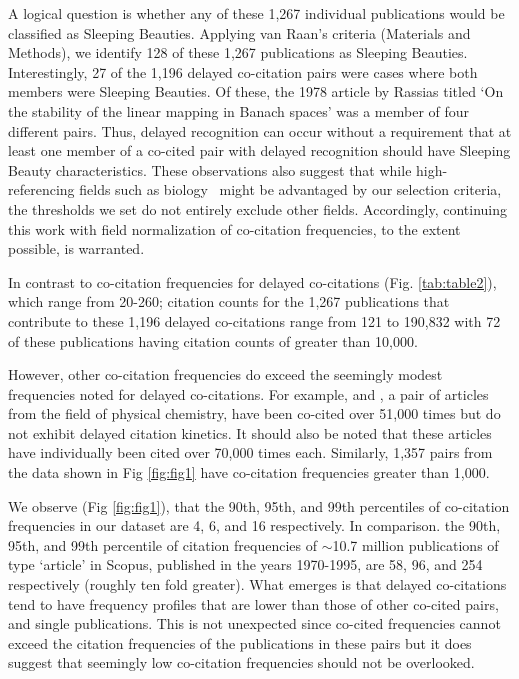 \documentclass[11pt, oneside]{article}   	%
\begin{document}
A logical question is whether any of these 1,267 individual publications would be classified as Sleeping Beauties. Applying van Raan's criteria (Materials and Methods), we identify 128 of these 1,267 publications as Sleeping Beauties. Interestingly, 27 of the 1,196 delayed co-citation pairs were cases where both members were Sleeping Beauties. Of these, the 1978 article by Rassias titled `On the stability of the linear mapping in Banach spaces' was a member of four different pairs. Thus, delayed recognition can occur without a requirement that at least one member of a co-cited pair with delayed recognition should have Sleeping Beauty characteristics. These  observations also suggest that while high-referencing fields such as biology~\citep{Small1980} might be advantaged by our selection criteria, the thresholds we set do not entirely exclude other fields. Accordingly, continuing this work with field normalization of co-citation frequencies, to the extent possible, is warranted.

In contrast to co-citation frequencies for delayed co-citations (Fig. \ref{tab:table2}), which range from 20-260; citation counts for the 1,267 publications that contribute to these 1,196 delayed co-citations range from 121 to 190,832 with 72 of these publications having citation counts of greater than 10,000. 

However, other co-citation frequencies do exceed the seemingly modest frequencies noted for delayed co-citations. For example, \cite{becke_densityfunctional_1993} and \cite{lee_development_1988}, a pair of articles from the field of physical chemistry, have been co-cited over 51,000 times but do not exhibit delayed citation kinetics. It should also be noted that these articles have individually been cited over 70,000 times each. Similarly, 1,357 pairs from the data shown in Fig \ref{fig:fig1} have co-citation frequencies greater than 1,000. 

We observe (Fig \ref{fig:fig1}), that the 90th, 95th, and 99th percentiles of co-citation frequencies in our dataset are 4, 6, and 16 respectively. In comparison. the 90th, 95th, and 99th percentile of citation frequencies of $\sim$10.7 million publications of type `article' in Scopus, published in the years 1970-1995, are 58, 96, and 254 respectively (roughly ten fold greater). What emerges is that delayed co-citations tend to have frequency profiles that are lower than those of other co-cited pairs, and single publications. This is not unexpected since co-cited frequencies cannot exceed the citation frequencies of the publications in these pairs but it does suggest that seemingly low co-citation frequencies should not be overlooked. 
\end{document}

